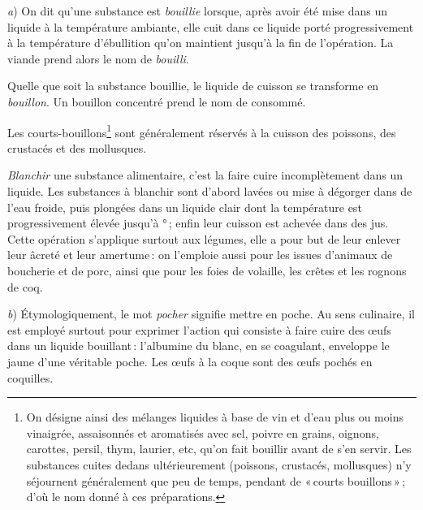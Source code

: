 \textit{a}) On dit qu'une substance est \textit{bouillie} lorsque, après avoir
été mise dans un liquide à la température ambiante, elle cuit dans ce liquide
porté progressivement à la température d'ébullition qu'on maintient jusqu'à la
fin de l'opération. La viande prend alors le nom de \textit{bouilli}.

Quelle que soit la substance bouillie, le liquide de cuisson se transforme en
\textit{bouillon}. Un bouillon concentré prend le nom de consommé.

Les courts-bouillons\footnote{On désigne ainsi des mélanges liquides à base de
vin et d'eau plus ou moins vinaigrée, assaisonnés et aromatisés avec sel,
poivre en grains, oignons, carottes, persil, thym, laurier, etc, qu'on fait
bouillir avant de s'en servir. Les substances cuites dedans ultérieurement
(poissons, crustacés, mollusques) n'y séjournent généralement que peu de temps,
pendant de « courts bouillons » ; d’où le nom donné à ces préparations.} sont
généralement réservés à la cuisson des poissons, des crustacés et des
mollusques.


\textit{Blanchir} une substance alimentaire, c'est la faire cuire
incomplètement dans un liquide. Les substances à blanchir sont d'abord lavées
ou mise à dégorger dans de l'eau froide, puis plongées dans un liquide clair
dont la température est progressivement élevée jusqu'à {\mmm}° ; enfin leur
cuisson est achevée dans des jus. Cette opération s'applique surtout aux
légumes, elle a pour but de leur enlever leur âcreté et leur amertume : on
l'emploie aussi pour les issues d'animaux de boucherie et de porc, ainsi que
pour les foies de volaille, les crêtes et les rognons de coq.

\textit{b}) Étymologiquement, le mot \textit{pocher} signifie mettre en poche.
Au sens culinaire, il est employé surtout pour exprimer l'action qui consiste
à faire cuire des œufs dans un liquide bouillant : l'albumine du blanc, en se
coagulant, enveloppe le jaune d'une véritable poche. Les œufs à la coque sont
des œufs pochés en coquilles.


